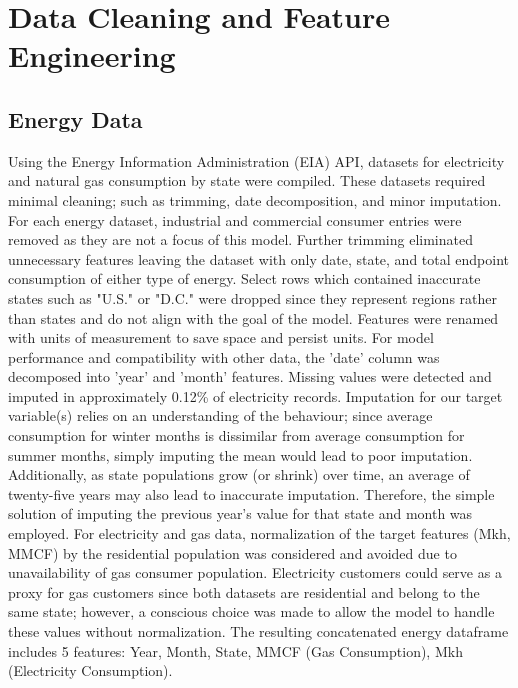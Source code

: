 \documentclass[11pt,a4paper]{article}
\begin{document}
\section{Data Cleaning and Feature Engineering}

\subsection{Energy Data}
Using the Energy Information Administration (EIA) API, datasets for electricity and natural gas consumption by state were compiled. These datasets required minimal cleaning; such as trimming, date decomposition, and minor imputation. \newline
For each energy dataset, industrial and commercial consumer entries were removed as they are not a focus of this model. Further trimming eliminated unnecessary features leaving the dataset with only date, state, and total endpoint consumption of either type of energy. Select rows which contained inaccurate states such as "U.S." or "D.C." were dropped since they represent regions rather than states and do not align with the goal of the model. Features were renamed with units of measurement to save space and persist units. For model performance and compatibility with other data, the 'date' column was decomposed into 'year' and 'month' features. Missing values were detected and imputed in approximately 0.12\% of electricity records. \newline
Imputation for our target variable(s) relies on an understanding of the behaviour; since average consumption for winter months is dissimilar from average consumption for summer months, simply imputing the mean would lead to poor imputation. Additionally, as state populations grow (or shrink) over time, an average of twenty-five years may also lead to inaccurate imputation. Therefore, the simple solution of imputing the previous year's value for that state and month was employed.\newline
For electricity and gas data, normalization of the target features (Mkh, MMCF) by the residential population was considered and avoided due to unavailability of gas consumer population. Electricity customers could serve as a proxy for gas customers since both datasets are residential and belong to the same state; however, a conscious choice was made to allow the model to handle these values without normalization.
The resulting concatenated energy dataframe includes 5 features:
Year, Month, State, MMCF (Gas Consumption), Mkh (Electricity Consumption).
\end{document}
